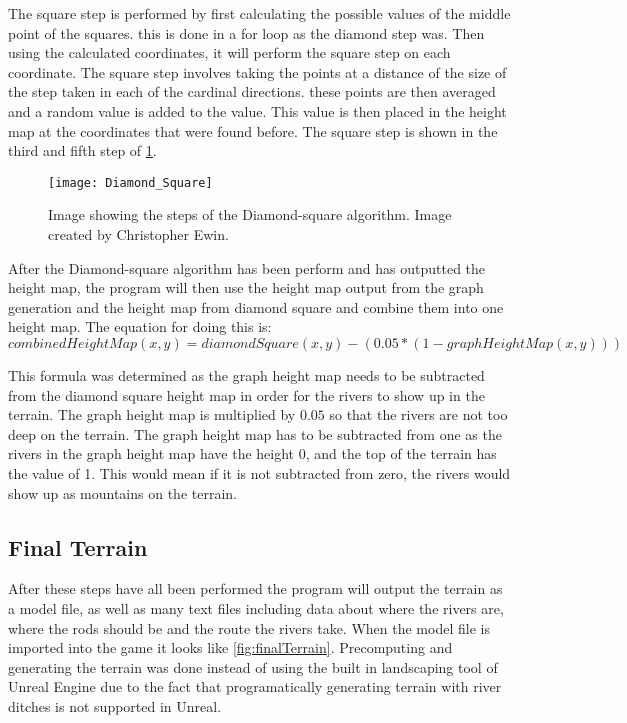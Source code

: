 
	The square step is performed by first calculating the possible values of the middle point of the squares. this is done in a for loop as the diamond step was. Then using the calculated coordinates, it will perform the square step on each coordinate. The square step involves taking the points at a distance of the size of the step taken in each of the cardinal directions. these points are then averaged and a random value is added to the value. This value is then placed in the height map at the coordinates that were found before. The square step is shown in the third and fifth step of \ref{fig:DiamondSquare}.

\begin{figure}[H]
	\texttt{[image: Diamond\_Square]}
	\centering
	\caption{Image showing the steps of the Diamond-square algorithm. Image created by Christopher Ewin\cite{diamondsquare}.}
	\label{fig:DiamondSquare}
\end{figure}

	After the Diamond-square algorithm has been perform and has outputted the height map, the program will then use the height map output from the graph generation and the height map from diamond square and combine them into one height map. The equation for doing this is:\\

	$$combinedHeightMap(x, y) =  diamondSquare(x, y) - (0.05 * (1 - graphHeightMap(x, y)))$$

	This formula was determined as the graph height map needs to be subtracted from the diamond square height map in order for the rivers to show up in the terrain. The graph height map is multiplied by $0.05$ so that the rivers are not too deep on the terrain. The graph height map has to be subtracted from one as the rivers in the graph height map have the height 0, and the top of the terrain has the value of 1. This would mean if it is not subtracted from zero, the rivers would show up as mountains on the terrain.\\

\subsection{Final Terrain}
	After these steps have all been performed the program will output the terrain as a model file, as well as many text files including data about where the rivers are, where the rods should be and the route the rivers take. When the model file is imported into the game it looks like \ref{fig:finalTerrain}. Precomputing and generating the terrain was done instead of using the built in landscaping tool of Unreal Engine due to the fact that programatically generating terrain with river ditches is not supported in Unreal.


